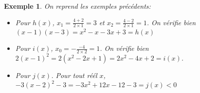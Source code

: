\documentclass[a4paper,11pt]{article}
\theoremstyle{break}
\newtheorem{exemple}{Exemple}
\begin{document}
  \begin{exemple}
    On reprend les exemples précédents:
    \begin{itemize}
     \item Pour $h(x)$, $x_1=\frac{4+2}{2 \times 1}=3$ et $x_2=\frac{4-2}{2 \times 1}=1$.
    On vérifie bien $(x-1)(x-3)=x^2-x-3x+3=h(x)$ 
      
    \item Pour $i(x)$, $x_0=-\frac{-4}{2 \times 2}=1$. On vérifie bien
    $2(x-1)^2=2(x^2-2x+1)=2x^2-4x+2=i(x)$.
     \item Pour $j(x)$. Pour tout réél $x$, $-3(x-2)^2-3=-3x^2+12x-12-3=j(x)<0$
    \end{itemize}
   \end{exemple}
   
\end{document}
